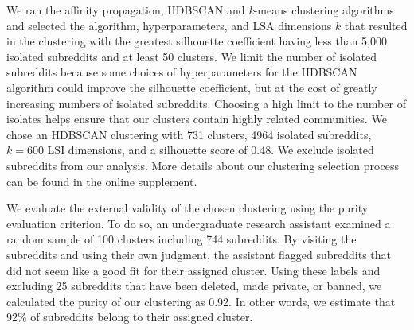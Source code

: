 \documentclass[letterpaper]{article}\usepackage[]{graphicx}\usepackage[]{color}
\begin{document}
We ran the affinity propagation, HDBSCAN and \textit{k}-means clustering algorithms and selected the algorithm, hyperparameters, and LSA dimensions $k$ that resulted in the clustering with the greatest silhouette coefficient having less than 5,000 isolated subreddits and at least 50 clusters. 
We limit the number of isolated subreddits because some choices of hyperparameters for the HDBSCAN algorithm could improve the silhouette coefficient, but at the cost of greatly increasing numbers of isolated subreddits.  
Choosing a high limit to the number of isolates helps ensure that our clusters contain highly related communities. 
We chose an HDBSCAN clustering with 731 clusters, 4964 isolated subreddits, $k=600$ LSI dimensions, and a silhouette score of 0.48.    We exclude isolated subreddits from our analysis. More details about our clustering selection process can be found in the online supplement.


We evaluate the external validity of the chosen clustering using the purity evaluation criterion.
To do so, an undergraduate research assistant examined a random sample of 100 clusters including 744 subreddits.  By visiting the subreddits and using their own judgment, the assistant flagged subreddits that did not seem like a good fit for their assigned cluster. Using these labels and excluding 25 subreddits that have been deleted, made private, or banned, we calculated the purity of our clustering as 0.92. In other words, we estimate that  92\% of subreddits belong to their assigned cluster.

\end{document}
